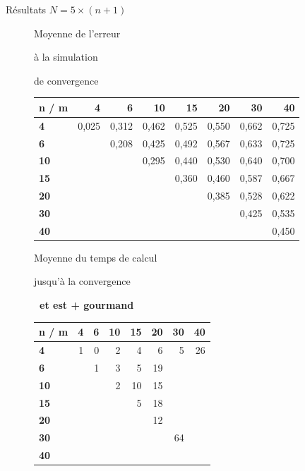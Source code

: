 \documentclass[10pt,xcolor=table,color={dvipsnames,usenames},ignorenonframetext,usepdftitle=false,french]{beamer}
\begin{document}
\begin{frame}{Résultats \(N=5\times (n+1)\)}
\begin{figure}
\begin{minipage}{.6\textwidth}
\end{minipage}
\end{figure}

\begin{figure}
\begin{minipage}{.4\textwidth}
\normalsize{Moyenne de l'erreur

à la simulation

de convergence
}
\end{minipage}%
\begin{minipage}{.6\textwidth}

\begin{tabular}{>{\bfseries}l|r|r|r|r|r|r|r}
\hline
\textbf{n / m } & \textbf{4} & \textbf{6} & \textbf{10} & \textbf{15} & \textbf{20} & \textbf{30} & \textbf{40}\\
\hline
4 & 0,025 & 0,312 & 0,462 & 0,525 & 0,550 & 0,662 & 0,725\\
\hline
6 &  & 0,208 & 0,425 & 0,492 & 0,567 & 0,633 & 0,725\\
\hline
10 &  &  & 0,295 & 0,440 & 0,530 & 0,640 & 0,700\\
\hline
15 &  &  &  & 0,360 & 0,460 & 0,587 & 0,667\\
\hline
20 &  &  &  &  & 0,385 & 0,528 & 0,622\\
\hline
30 &  &  &  &  &  & 0,425 & 0,535\\
\hline
40 &  &  &  &  &  &  & 0,450\\
\hline
\end{tabular}
\end{minipage}
\end{figure}

\begin{figure}
\begin{minipage}{.4\textwidth}
\normalsize{Moyenne du temps de calcul

jusqu'à la convergence

\faArrowCircleRight \textbf{\ et est + gourmand}
}
\end{minipage}%
\begin{minipage}{.6\textwidth}

\begin{tabular}{>{\bfseries}l|r|r|r|r|r|r|r}
\hline
\textbf{n / m } & \textbf{4} & \textbf{6} & \textbf{10} & \textbf{15} & \textbf{20} & \textbf{30} & \textbf{40}\\
\hline
4 & 1 & 0 & 2 & 4 & 6 & 5 & 26\\
\hline
6 &  & 1 & 3 & 5 & 19 &  & \\
\hline
10 &  &  & 2 & 10 & 15 &  & \\
\hline
15 &  &  &  & 5 & 18 &  & \\
\hline
20 &  &  &  &  & 12 &  & \\
\hline
30 &  &  &  &  &  & 64 & \\
\hline
40 &  &  &  &  &  &  & \\
\hline
\end{tabular}
\end{minipage}
\end{figure}


\end{frame}
\end{document}
